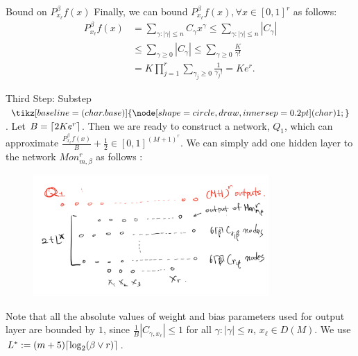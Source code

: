 \documentclass{if-beamer}
\DeclarePairedDelimiter{\ceil}{\lceil}{\rceil}
\newcommand*\circled[1]{\tikz[baseline=(char.base)]{
            \node[shape=circle,draw,inner sep=0.2pt] (char) {#1};}}
\begin{document}
\begin{frame}{Bound on $P^{\beta}_{x_{\ell}}f(x)$}
    Finally, we can bound $P^{\beta}_{x_{\ell}}f(x),\forall x\in[0,1]^{r}$ as follows:
    \begin{align*}
        P_{x_{\ell}}^{\beta}f(x)&=\sum_{\gamma:|\gamma|\leq n} C_{\gamma}x^{\gamma}
        \leq \sum_{\gamma:|\gamma|\leq n} |C_{\gamma}| \\
        &\leq \sum_{\gamma \geq 0} |C_{\gamma}| \leq \sum_{\gamma \geq 0} \frac{K}{\gamma!} \\
        &= K \prod_{j=1}^{r} \sum_{\gamma_{j} \geq 0} \frac{1}{\gamma_{j}!}=Ke^{r}.
    \end{align*}
\end{frame}


\begin{frame}{Third Step: Substep $\circled{1}$.}
Let $B=\ceil{2Ke^{r}}$. Then we are ready to construct a network, $Q_{1}$, which can approximate $\frac{P^{\beta}_{x_{\ell}}f(x)}{B}+\frac{1}{2}\in[0,1]^{(M+1)^{r}}$.
We can simply add one hidden layer to the network $Mon_{m,\beta}^{r}$ as follows : 

\begin{figure}[htbp]
    \includegraphics[width=0.8\textwidth]{Substep1.png}
    \label{fig:figure8}
\end{figure}
    
Note that all the absolute values of weight and bias parameters used for output layer are bounded by $1$, since $\frac{1}{B}|C_{\gamma,x_{\ell}}|\leq 1$ for all $\gamma:|\gamma|\leq n$, $x_{\ell}\in D(M)$.
We use $L^*:=(m+5)\ceil{\log_{2}(\beta\vee r)}$.
\end{frame}
\end{document}
